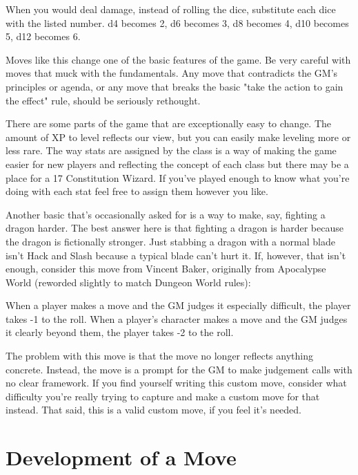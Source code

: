  
\startExample
When you would deal damage, instead of rolling the dice, substitute each dice with the listed number. d4 becomes 2, d6 becomes 3, d8 becomes 4, d10 becomes 5, d12 becomes 6.
\stopExample
 

Moves like this change one of the basic features of the game. Be very careful with moves that muck with the fundamentals. Any move that contradicts the GM's principles or agenda, or any move that breaks the basic "take the action to gain the effect" rule, should be seriously rethought.

 

There are some parts of the game that are exceptionally easy to change. The amount of XP to level reflects our view, but you can easily make leveling more or less rare. The way stats are assigned by the class is a way of making the game easier for new players and reflecting the concept of each class but there may be a place for a 17 Constitution Wizard. If you've played enough to know what you're doing with each stat feel free to assign them however you like.

 

Another basic that's occasionally asked for is a way to make, say, fighting a dragon harder. The best answer here is that fighting a dragon is harder because the dragon is fictionally stronger. Just stabbing a dragon with a normal blade isn't Hack and Slash because a typical blade can't hurt it. If, however, that isn't enough, consider this move from Vincent Baker, originally from Apocalypse World (reworded slightly to match Dungeon World rules):

 
\startExample
When a player makes a move and the GM judges it especially difficult, the player takes -1 to the roll. When a player's character makes a move and the GM judges it clearly beyond them, the player takes -2 to the roll.
\stopExample
 

The problem with this move is that the move no longer reflects anything concrete. Instead, the move is a prompt for the GM to make judgement calls with no clear framework. If you find yourself writing this custom move, consider what difficulty you're really trying to capture and make a custom move for that instead. That said, this is a valid custom move, if you feel it's needed.

 
\section{Development of a Move}    
 

